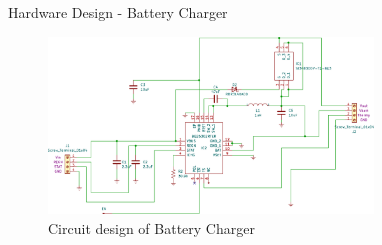 \documentclass[aspectratio=169]{beamer}
\begin{document}
		
		\begin{frame}{Hardware Design - Battery Charger }
			\begin{figure}[h]
				\centering
				\includegraphics[width=0.77\textwidth]{diag/charg.pdf}
				\caption{Circuit design of Battery Charger}
				\label{fig:mesh1}
			\end{figure}
		\end{frame}
		
\end{document}
